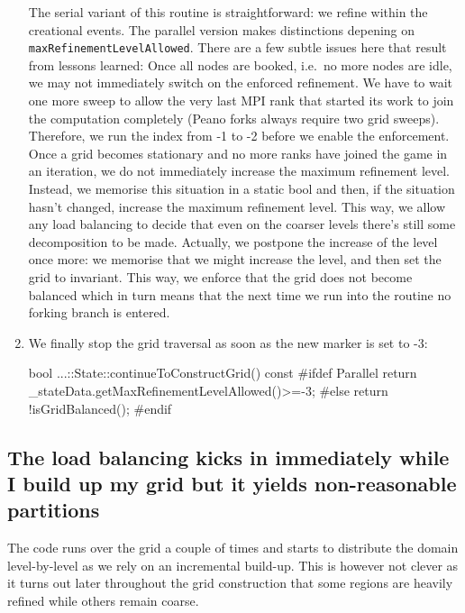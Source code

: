 \begin{enumerate}
  \noindent
  The serial variant of this routine is straightforward: we refine within the
  creational events. The parallel version makes distinctions depening on
  \texttt{maxRefinementLevelAllowed}.
  There are a few subtle issues here that result from lessons learned:
  Once all nodes are booked, i.e.~no more nodes are idle, we may not immediately
  switch on the enforced refinement. We have to wait one more sweep to allow the
  very last MPI rank that started its work to join the computation completely
  (Peano forks always require two grid sweeps). Therefore, we run the index from
  -1 to -2 before we enable the enforcement. Once a grid becomes stationary and
  no more ranks have joined the game in an iteration, we do not immediately
  increase the maximum refinement level. Instead, we memorise this situation in
  a static bool and then, if the situation hasn't changed, increase the maximum
  refinement level. This way, we allow any load balancing to decide that even on
  the coarser levels there's still some decomposition to be made. Actually, we
  postpone the increase of the level once more: we memorise that we might
  increase the level, and then set the grid to invariant. This way, we enforce
  that the grid does not become balanced which in turn means that the next time
  we run into the routine no forking branch is entered.
  
 \item We finally stop the grid traversal as soon as the new marker is set to
 -3:
  \begin{code}
bool ...::State::continueToConstructGrid() const {
  #ifdef Parallel
  return _stateData.getMaxRefinementLevelAllowed()>=-3;
  #else
  return !isGridBalanced();
  #endif
}
  \end{code}
\end{enumerate}



\subsection{The load balancing kicks in immediately while I build up my grid but it
yields non-reasonable partitions}


\begin{smell}
The code runs over the grid a couple of times and starts to distribute the
domain level-by-level as we rely on an incremental build-up. This is however not
clever as it turns out later throughout the grid construction that some regions
are heavily refined while others remain coarse.
\end{smell}


